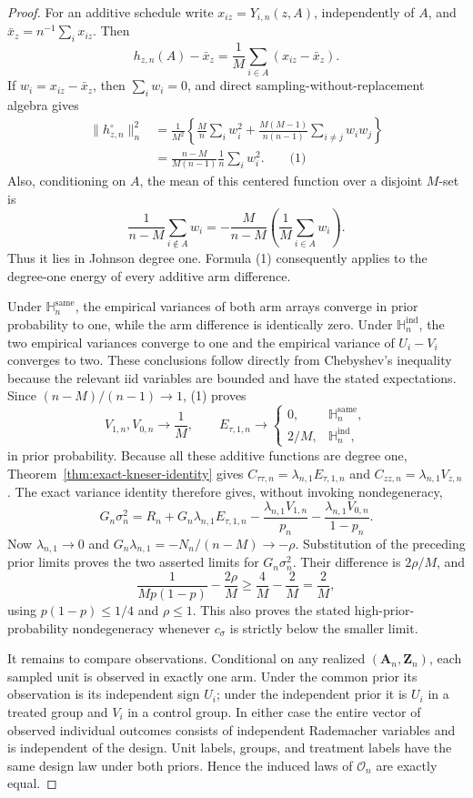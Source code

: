 \documentclass{article}
\begin{document}
\begin{proof}
For an additive schedule write \(x_{iz}=Y_{i,n}(z,A)\), independently of \(A\), and \(\bar x_z=n^{-1}\sum_i x_{iz}\).  Then
\[
 h_{z,n}(A)-\bar x_z=\frac1M\sum_{i\in A}(x_{iz}-\bar x_z).
\]
If \(w_i=x_{iz}-\bar x_z\), then \(\sum_iw_i=0\), and direct sampling-without-replacement algebra gives
\[
 \begin{aligned}
 \|h_{z,n}^{\circ}\|_n^2
 &=\frac1{M^2}\left\{\frac Mn\sum_iw_i^2
 +\frac{M(M-1)}{n(n-1)}\sum_{i\ne j}w_iw_j\right\}\\
 &=\frac{n-M}{M(n-1)}\frac1n\sum_iw_i^2. \qquad\text{(1)}
 \end{aligned}
\]
Also, conditioning on \(A\), the mean of this centered function over a disjoint \(M\)-set is
\[
 \frac1{n-M}\sum_{i\notin A}w_i
 =-\frac M{n-M}\left(\frac1M\sum_{i\in A}w_i\right).
\]
Thus it lies in Johnson degree one.  Formula (1) consequently applies to the degree-one energy of every additive arm difference.

Under \(\mathbb H_n^{\mathrm{same}}\), the empirical variances of both arm arrays converge in prior probability to one, while the arm difference is identically zero.  Under \(\mathbb H_n^{\mathrm{ind}}\), the two empirical variances converge to one and the empirical variance of \(U_i-V_i\) converges to two.  These conclusions follow directly from Chebyshev's inequality because the relevant iid variables are bounded and have the stated expectations.  Since \((n-M)/(n-1)\to1\), (1) proves
\[
 V_{1,n},V_{0,n}\longrightarrow\frac1M,\qquad
 E_{\tau,1,n}\longrightarrow
 \begin{cases}0,&\mathbb H_n^{\mathrm{same}},\\2/M,&\mathbb H_n^{\mathrm{ind}},\end{cases}
\]
in prior probability.  Because all these additive functions are degree one, Theorem~\ref{thm:exact-kneser-identity} gives \(C_{\tau\tau,n}=\lambda_{n,1}E_{\tau,1,n}\) and \(C_{zz,n}=\lambda_{n,1}V_{z,n}\).  The exact variance identity therefore gives, without invoking nondegeneracy,
\[
 G_n\sigma_n^2
 =R_n+G_n\lambda_{n,1}E_{\tau,1,n}
 -\frac{\lambda_{n,1}V_{1,n}}{p_n}
 -\frac{\lambda_{n,1}V_{0,n}}{1-p_n}.
\]
Now \(\lambda_{n,1}\to0\) and \(G_n\lambda_{n,1}=-N_n/(n-M)\to-\rho\).  Substitution of the preceding prior limits proves the two asserted limits for \(G_n\sigma_n^2\).  Their difference is \(2\rho/M\), and
\[
 \frac1{Mp(1-p)}-\frac{2\rho}{M}
 \ge\frac4M-\frac2M=\frac2M,
\]
using \(p(1-p)\le1/4\) and \(\rho\le1\).  This also proves the stated high-prior-probability nondegeneracy whenever \(c_\sigma\) is strictly below the smaller limit.

It remains to compare observations.  Conditional on any realized \((\mathbf A_n,\mathbf Z_n)\), each sampled unit is observed in exactly one arm.  Under the common prior its observation is its independent sign \(U_i\); under the independent prior it is \(U_i\) in a treated group and \(V_i\) in a control group.  In either case the entire vector of observed individual outcomes consists of independent Rademacher variables and is independent of the design.  Unit labels, groups, and treatment labels have the same design law under both priors.  Hence the induced laws of \(\mathcal O_n\) are exactly equal.
\end{proof}
\end{document}
